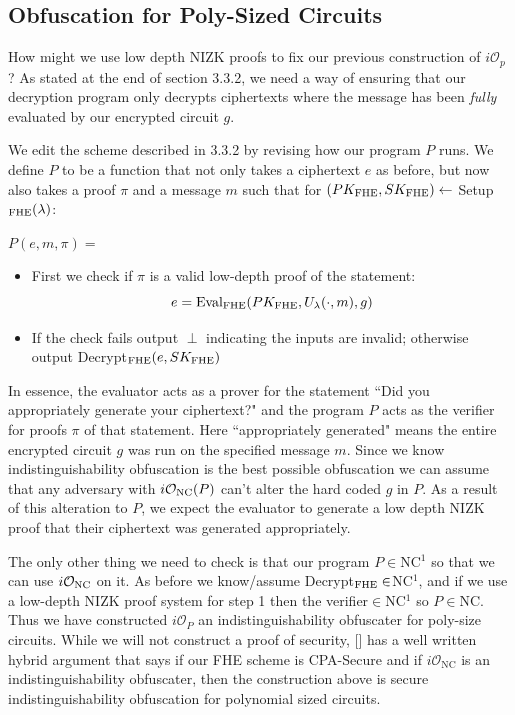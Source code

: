 \documentclass[12pt,twoside]{reedthesis}
\begin{document}
    \subsection{Obfuscation for Poly-Sized Circuits}
    
    \par How might we use low depth NIZK proofs to fix our previous construction of $i\mathcal{O}_p$? As stated at the end of section 3.3.2, we need a way of ensuring that our decryption program only decrypts ciphertexts where the message has been \textit{fully} evaluated by our encrypted circuit $g$.
    \par We edit the scheme described in 3.3.2 by revising how our program $P$ runs. We define $P$ to be a function that not only takes a ciphertext $e$ as before, but now also takes a proof $\pi$ and a message $m$ such that for $(PK_\text{FHE},SK_\text{FHE}) \leftarrow$ Setup$_\text{FHE}(\lambda)$:
    
   
   \par$P(e,m,\pi) =$
   \begin{itemize}
   \item First we check if $\pi$ is a valid low-depth proof of the statement:
   $$e =\text{Eval}_\text{FHE}(PK_\text{FHE},U_\lambda(\cdot,m),g) $$
   \item If the check fails output $\perp$ indicating the inputs are invalid; otherwise output Decrypt$_\text{FHE}(e,SK_\text{FHE})$
   \end{itemize}
    
    
    \par In essence, the evaluator acts as a prover for the statement ``Did you appropriately generate your ciphertext?" and the program $P$ acts as the verifier for proofs $\pi$ of that statement. Here ``appropriately generated" means the entire encrypted circuit $g$ was run on the specified message $m$. Since we know indistinguishability obfuscation is the best possible obfuscation we can assume that any adversary with $i\mathcal{O}_\text{NC}(P)$ can't alter the hard coded $g$ in $P$. As a result of this alteration to $P$, we expect the evaluator to generate a low depth NIZK proof that their ciphertext was generated appropriately.
    \par The only other thing we need to check is that our program $P\in$NC$^1$ so that we can use $i\mathcal{O}_\text{NC}$ on it. As before we know/assume Decrypt$_\text{FHE} \in$NC$^1$, and if we use a low-depth NIZK proof system for step 1 then the verifier$\in$NC$^1$ so $P\in$NC. Thus we have constructed $i\mathcal{O}_P$ an indistinguishability obfuscater for poly-size circuits. While we will not construct a proof of security, [\cite{Garg:2013}] has a well written hybrid argument that says if our FHE scheme is CPA-Secure and if $i\mathcal{O}_\text{NC}$  is an indistinguishability obfuscater, then the construction above is secure indistinguishability obfuscation for polynomial sized circuits.
    
\end{document}
